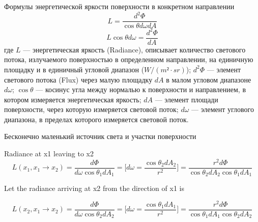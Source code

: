\documentclass{beamer}
\begin{document}
	\begin{frame}{}
		Формулы энергетической яркости поверхности в конкретном направлении
		\[
			L = \frac{d^2 \Phi}{\cos \theta d \omega d A}
		\] 
		\[
			L \cos \theta d \omega = \frac{d^2 \Phi}{ d A}
		\] 
		где 
		$L$ --- энергетическая яркость (Radiance), описывает количество светового потока, излучаемого поверхностью в определенном направлении, на единичную площадку и в единичный угловой диапазон ($W/(m²\cdot sr)$);
		$d^2 \Phi$ --- элемент светового потока (Flux) через малую площадку $dA$  в малом угловом диапазоне $d \omega$;
		$\cos \theta$ --- косинус угла между нормалью к поверхности и направлением, в котором измеряется энергетическая яркость;
		$dA$ --- элемент площади поверхности, через которую измеряется световой поток;
		$d \omega$ --- элемент углового диапазона, в пределах которого измеряется световой поток.
		
	\end{frame}

	\begin{frame}{Бесконечно маленький источник света и участки поверхности}

		Radiance at x1 leaving to x2
		\[
			L(x_1,x_1 \to x_2) = 
			\frac{d \Phi}{d \omega \cos \theta_1 d A_1}
			=
			\biggl[ 
				d \omega = \frac{\cos \theta_2 d A_2 }{ r^2}
			\biggr]
			=
			\frac{r^2 d \Phi}{\cos \theta_2 d A_2   \cos \theta_1 d A_1}
		\]

		Let the radiance arriving at x2 from the direction of x1 is

		\[
			L(x_2,x_1 \to x_2) = 
			\frac{d \Phi}{d \omega \cos \theta_2 d A_2}
			=
			\biggl[ 
				d \omega = \frac{\cos \theta_1 d A_1 }{ r^2}
			\biggr]
			=
			\frac{r^2 d \Phi}{\cos \theta_1 d A_1 \cos \theta_2 d A_2}
		\]

	\end{frame}
\end{document}
